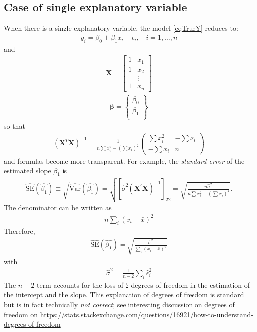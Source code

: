 \documentclass[11pt]{article}
\theoremstyle{remark}
\begin{document}
\subsection{Case of single explanatory variable}
When there is a single explanatory variable, the model \eqref{eqTrueY} reduces to:
\begin{eqnarray}
y_i = \beta_0 + \beta_1 x_i + \epsilon_i,\:\:\:\:i = 1,\hdots,n
\end{eqnarray}
and
\begin{eqnarray}
\mathbf{X} =
\left[
\begin{array}{cc}
1 & x_1\\
1 & x_2\\
  & \vdots\\
1 & x_n
\end{array}
\right]
\end{eqnarray}
\begin{eqnarray}
\boldsymbol{\beta} =
\left\{
\begin{array}{c}
\beta_0\\
\beta_1\\
\end{array}
\right\}
\end{eqnarray}
so that
\begin{eqnarray}
(\mathbf{X}^T \mathbf{X})^{-1} = \frac{1}{n\sum x_i^2 - (\sum x_i)^2}
\left(
\begin{array}{cc}
\sum x_i^2 & -\sum x_i \\
-\sum x_i  & n
\end{array}
\right)
\end{eqnarray}
and formulas become more transparent. For example, the \emph{standard error} of the estimated slope $\beta_1$ is
\begin{eqnarray}
\widehat{\text{SE}}(\hat{\beta_1}) \equiv \sqrt{\widehat{\text{Var}}(\hat{\beta_1})} = \sqrt{[\hat{\sigma}^2  (\mathbf{X}^{\prime} \mathbf{X})^{-1}]_{22}} = \sqrt{\frac{n \hat{\sigma}^2}{n\sum x_i^2 - (\sum x_i)^2}}.
\end{eqnarray}
The denominator can be written as
\begin{eqnarray}
n \sum_i (x_i - \bar{x})^2
\end{eqnarray}
Therefore,
\begin{eqnarray}
\widehat{\text{SE}}(\hat{\beta_1}) = \sqrt{\frac{\hat{\sigma}^2}{\sum_i (x_i - \bar{x})^2}}
\end{eqnarray}
with
\begin{eqnarray}
\hat{\sigma}^2 = \frac{1}{n-2} \sum_i \hat{\epsilon}_i^2
\end{eqnarray}
The $n-2$ term accounts for the loss of 2 degrees of freedom in the estimation of the intercept and the slope. This explanation of degrees of freedom is standard but is in fact technically \emph{not correct}; see interesting discussion on degrees of freedom on \url{https://stats.stackexchange.com/questions/16921/how-to-understand-degrees-of-freedom}
\end{document}
